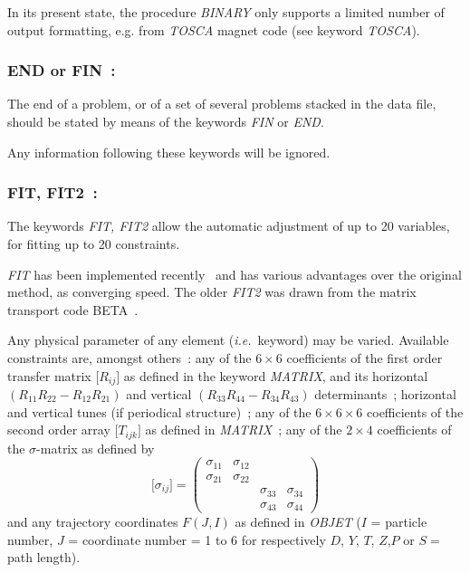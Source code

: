 \noindent In its present state, the procedure \textsl{BINARY} 
only supports a limited number of output formatting, e.g. from  \textsl{TOSCA} magnet code 
 (see keyword \textsl{TOSCA}). 


\newpage

\subsubsection*{END or FIN~: \ENDTitl}  \label{FIN}  \label{END} 
\medskip

The end of a problem, or of a set of several problems stacked in 
the data file, should be stated by means of the keywords \textsl{FIN} or
\textsl{END}.  
\bigskip

\noindent Any information following these keywords will be ignored. 

\newpage

\subsubsection*{FIT, FIT2~:  \FITTitl}  \label{FIT}  \label{FIT2}  
\medskip

 The keywords \textsl{FIT, FIT2} allow the automatic adjustment of up to 20 
variables, for fitting up to 20 constraints. 

\noindent \textsl{FIT} has been implemented  recently~\cite{NedlerMead} and has various advantages over the original method, 
as converging speed. The  older \textsl{FIT2} 
was drawn from  the matrix transport code BETA~\cite{Biblio10}. 

\noindent Any physical parameter of any element (\emph{i.e.}~keyword) may 
be varied. Available constraints  are, amongst others~:  any of the $6 \times 6$
coefficients of the first order transfer matrix $ \lbrack R_{ij}\rbrack $ as defined in the
keyword \textsl{MATRIX}, and its horizontal $ (R_{11 }R_{22} -R_{12} R_{21}) $ and
vertical $ (R_{33} R_{44}- R_{34} R_{43}) $ determinants~; horizontal and vertical tunes (if 
periodical structure)~;  any of the
$6\times 6 \times6 $ coefficients of the second order array $ \lbrack T_{ijk}\rbrack $ 
as defined in \textsl{MATRIX}~; any of the $ 2 \times 4 $ coefficients of the 
\mbox{$\sigma$-matrix} as defined by
%
$$ \lbrack \sigma_{ ij}\rbrack  = 
\begin{pmatrix}
	\sigma_{11} &  \sigma_{12} &   &  \\
	 \sigma_{21} &  \sigma_{22} &  & \\
	             &               &  \sigma_{33} & \sigma_{34} \\
	             &               & \sigma_{43} & \sigma_{44} 
\end{pmatrix}
$$
%
 and any trajectory coordinates $ F(J,I) $ as defined in \textsl{OBJET} 
($ I $  =  particle number, $ J $  = coordinate number = 1 to 6 for 
respectively $ D$, $Y$, $T$, $Z$,$ P $ or $ S= $path length). 

